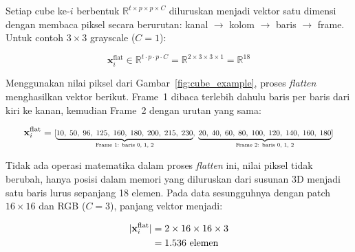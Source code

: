 Setiap cube ke-$i$ berbentuk $\mathbb{R}^{t\times p\times p\times C}$
diluruskan menjadi vektor satu dimensi dengan membaca piksel secara
berurutan: kanal $\to$ kolom $\to$ baris $\to$ frame.
Untuk contoh $3\times3$ grayscale ($C=1$):
 
\vspace{0.5cm}
\begin{equation}
  \mathbf{x}_i^{\text{flat}} \in
  \mathbb{R}^{t\cdot p\cdot p\cdot C}
  = \mathbb{R}^{2\times3\times3\times1}
  = \mathbb{R}^{18}
\end{equation}
\vspace{0.5cm}
 
\noindent
Menggunakan nilai piksel dari Gambar~\ref{fig:cube_example},
proses \textit{flatten} menghasilkan vektor berikut.
Frame~1 dibaca terlebih dahulu baris per baris dari kiri ke kanan,
kemudian Frame~2 dengan urutan yang sama:
 
\vspace{0.5cm}
\begin{equation}
  \mathbf{x}_i^{\text{flat}}
  = \scalebox{0.80}{\ensuremath{%
      [\underbrace{10,\;50,\;96,\;125,\;160,\;180,\;200,\;215,\;230}_{%
         \text{Frame 1: baris 0, 1, 2}},\;
       \underbrace{20,\;40,\;60,\;80,\;100,\;120,\;140,\;160,\;180}_{%
         \text{Frame 2: baris 0, 1, 2}}]}}
\end{equation}
\vspace{0.5cm}
 
\noindent
Tidak ada operasi matematika dalam proses \textit{flatten} ini, nilai
piksel tidak berubah, hanya posisi dalam memori yang diluruskan dari
susunan 3D menjadi satu baris lurus sepanjang 18 elemen.
Pada data sesungguhnya dengan patch $16\times16$ dan RGB ($C=3$),
panjang vektor menjadi:
 
\vspace{0.5cm}
\begin{align*}
  |\mathbf{x}_i^{\text{flat}}|
  &= 2 \times 16 \times 16 \times 3 \notag \\
  &= 1{.}536 \text{ elemen}
\end{align*}
\vspace{0.5cm}
 
